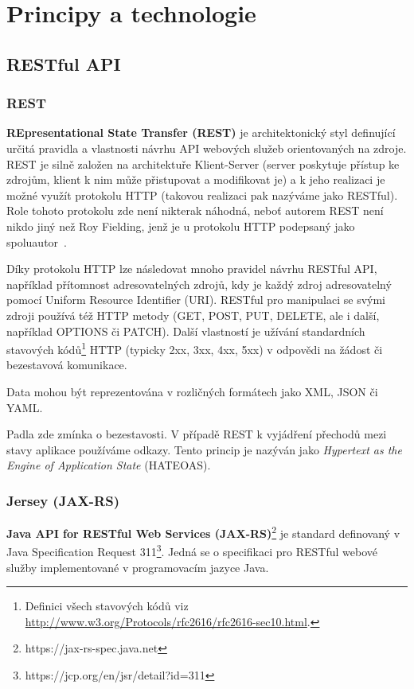\documentclass[thesis=M,czech]{FITthesis}[2014/05/07]
\begin{document}
\section{Principy a technologie}
\label{sec:sysanalys}

\subsection{RESTful API}
\label{rest}
\subsubsection{REST}
\textbf{REpresentational State Transfer (REST)} je architektonický styl definující určitá pravidla a vlastnosti návrhu API webových služeb orientovaných na zdroje. REST je silně založen na architektuře Klient-Server (server poskytuje přístup ke zdrojům, klient k nim může přistupovat a modifikovat je) a k jeho realizaci je možné využít protokolu HTTP (takovou realizaci pak nazýváme jako RESTful). Role tohoto protokolu zde není nikterak náhodná, neboť autorem REST není nikdo jiný než Roy Fielding, jenž je u protokolu HTTP podepsaný jako spoluautor~\cite{Fielding:2000:ASD:932295}. 

Díky protokolu HTTP lze následovat mnoho pravidel návrhu RESTful API, například přítomnost adresovatelných zdrojů, kdy je každý zdroj adresovatelný pomocí Uniform Resource Identifier (URI). RESTful pro manipulaci se svými zdroji používá též HTTP metody (GET, POST, PUT, DELETE, ale i další, například OPTIONS či PATCH). Další vlastností je užívání standardních stavových kódů\footnote{Definici všech stavových kódů viz \url{http://www.w3.org/Protocols/rfc2616/rfc2616-sec10.html}.} HTTP (typicky 2xx, 3xx, 4xx, 5xx) v odpovědi na žádost či bezestavová komunikace.

Data mohou být reprezentována v rozličných formátech jako XML, JSON či YAML.

Padla zde zmínka o bezestavosti. V případě REST k vyjádření přechodů mezi stavy aplikace používáme odkazy. Tento princip je nazýván jako \emph{Hypertext as the Engine of Application State} (HATEOAS). 

\subsubsection{Jersey (JAX-RS)}
\textbf{Java API for RESTful Web Services (JAX-RS)}\footnote{https://jax-rs-spec.java.net} je standard definovaný v Java Specification Request 311\footnote{https://jcp.org/en/jsr/detail?id=311}. Jedná se o specifikaci pro RESTful webové služby implementované v programovacím jazyce Java.
\end{document}
